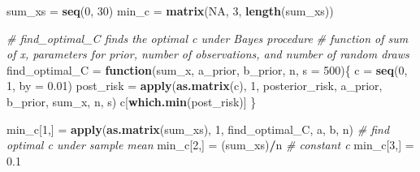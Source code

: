 \documentclass[
]{article}
\newenvironment{Shaded}{\begin{snugshade}}{\end{snugshade}}
\newcommand{\CommentTok}[1]{\textcolor[rgb]{0.56,0.35,0.01}{\textit{#1}}}
\newcommand{\ControlFlowTok}[1]{\textcolor[rgb]{0.13,0.29,0.53}{\textbf{#1}}}
\newcommand{\DataTypeTok}[1]{\textcolor[rgb]{0.13,0.29,0.53}{#1}}
\newcommand{\DecValTok}[1]{\textcolor[rgb]{0.00,0.00,0.81}{#1}}
\newcommand{\FloatTok}[1]{\textcolor[rgb]{0.00,0.00,0.81}{#1}}
\newcommand{\KeywordTok}[1]{\textcolor[rgb]{0.13,0.29,0.53}{\textbf{#1}}}
\newcommand{\NormalTok}[1]{#1}
\newcommand{\OperatorTok}[1]{\textcolor[rgb]{0.81,0.36,0.00}{\textbf{#1}}}
\newcommand{\OtherTok}[1]{\textcolor[rgb]{0.56,0.35,0.01}{#1}}
\newcommand{\StringTok}[1]{\textcolor[rgb]{0.31,0.60,0.02}{#1}}
\begin{document}
\begin{Shaded}
\begin{Highlighting}[]
\NormalTok{sum_xs =}\StringTok{ }\KeywordTok{seq}\NormalTok{(}\DecValTok{0}\NormalTok{, }\DecValTok{30}\NormalTok{)}
\NormalTok{min_c =}\StringTok{ }\KeywordTok{matrix}\NormalTok{(}\OtherTok{NA}\NormalTok{, }\DecValTok{3}\NormalTok{, }\KeywordTok{length}\NormalTok{(sum_xs))}

\CommentTok{# find_optimal_C finds the optimal c under Bayes procedure}
\CommentTok{# function of sum of x, parameters for prior, number of observations, and number of random draws }
\NormalTok{find_optimal_C =}\StringTok{ }\ControlFlowTok{function}\NormalTok{(sum_x, a_prior, b_prior, n, }\DataTypeTok{s =} \DecValTok{500}\NormalTok{)\{}
\NormalTok{  c =}\StringTok{ }\KeywordTok{seq}\NormalTok{(}\DecValTok{0}\NormalTok{, }\DecValTok{1}\NormalTok{, }\DataTypeTok{by =} \FloatTok{0.01}\NormalTok{)}
\NormalTok{  post_risk =}\StringTok{  }\KeywordTok{apply}\NormalTok{(}\KeywordTok{as.matrix}\NormalTok{(c), }\DecValTok{1}\NormalTok{, posterior_risk, a_prior, b_prior, sum_x, n, s)}
\NormalTok{  c[}\KeywordTok{which.min}\NormalTok{(post_risk)]}
\NormalTok{\}}

\NormalTok{min_c[}\DecValTok{1}\NormalTok{,] =}\StringTok{ }\KeywordTok{apply}\NormalTok{(}\KeywordTok{as.matrix}\NormalTok{(sum_xs), }\DecValTok{1}\NormalTok{, find_optimal_C, a, b, n)}
\CommentTok{# find optimal c under sample mean}
\NormalTok{min_c[}\DecValTok{2}\NormalTok{,] =}\StringTok{ }\NormalTok{(sum_xs)}\OperatorTok{/}\NormalTok{n}
\CommentTok{# constant c }
\NormalTok{min_c[}\DecValTok{3}\NormalTok{,] =}\StringTok{ }\FloatTok{0.1}


\end{Highlighting}
\end{Shaded}
\end{document}
